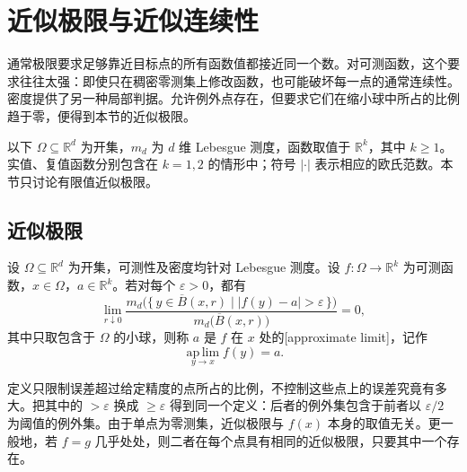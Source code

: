 \section{近似极限与近似连续性}
\label{b1:sec:1405}

通常极限要求足够靠近目标点的所有函数值都接近同一个数。对可测函数，这个要求往往太强：即使只在稠密零测集上修改函数，也可能破坏每一点的通常连续性。密度提供了另一种局部判据。允许例外点存在，但要求它们在缩小球中所占的比例趋于零，便得到本节的近似极限。

\ProseParagraphBreak

以下 \(\Omega\subseteq\mathbb R^d\) 为开集，\(m_d\) 为 \(d\) 维 Lebesgue 测度，函数取值于 \(\mathbb R^k\)，其中 \(k\geq1\)。实值、复值函数分别包含在 \(k=1,2\) 的情形中；符号 \(|\cdot|\) 表示相应的欧氏范数。本节只讨论有限值近似极限。

\subsection{近似极限}
\label{b1:subsec:140501}

\begin{definition}
\label{b1:def:approximate-limit}
设 \(\Omega\subseteq\mathbb R^d\) 为开集，可测性及密度均针对 Lebesgue 测度。设 \(f:\Omega\rightarrow\mathbb R^k\) 为可测函数，\(x\in\Omega\)，\(a\in\mathbb R^k\)。若对每个 \(\varepsilon>0\)，都有
\[
\lim_{r\downarrow0}
\frac{m_d\bigl(\{\,y\in\overline B(x,r)\mid |f(y)-a|>\varepsilon\,\}\bigr)}
{m_d\bigl(\overline B(x,r)\bigr)}=0,
\]
其中只取包含于 \(\Omega\) 的小球，则称 \(a\) 是 \(f\) 在 \(x\) 处的[approximate limit]，记作
\[
\operatorname*{ap\,lim}_{y\to x}f(y)=a.
\]
\end{definition}

定义只限制误差超过给定精度的点所占的比例，不控制这些点上的误差究竟有多大。把其中的 \(>\varepsilon\) 换成 \(\geq\varepsilon\) 得到同一个定义：后者的例外集包含于前者以 \(\varepsilon/2\) 为阈值的例外集。由于单点为零测集，近似极限与 \(f(x)\) 本身的取值无关。更一般地，若 \(f=g\) 几乎处处，则二者在每个点具有相同的近似极限，只要其中一个存在。

